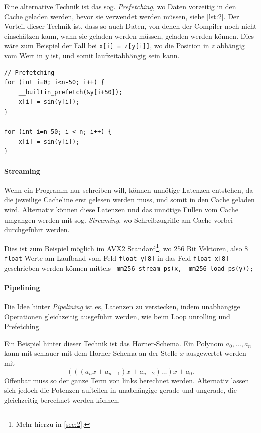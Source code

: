 Eine alternative Technik ist das sog. \emph{Prefetching}, wo Daten vorzeitig in den Cache geladen werden, bevor sie verwendet werden müssen, siehe \autoref{lst:2}.
Der Vorteil dieser Technik ist, dass so auch Daten, von denen der Compiler noch nicht einschätzen kann, wann sie geladen werden müssen, geladen werden können.
Dies wäre zum Beispiel der Fall bei \lstinline|x[i] = z[y[i]]|, wo die Position in \(z\) abhängig vom Wert in \(y\) ist, und somit laufzeitabhängig sein kann.

\begin{lstlisting}[label={lst:2}, caption={Prefetching für \autoref{lst:1}.}]
// Prefetching
for (int i=0; i<n-50; i++) {
    __builtin_prefetch(&y[i+50]);
    x[i] = sin(y[i]);
}

for (int i=n-50; i < n; i++) {
    x[i] = sin(y[i]);
}
\end{lstlisting}

\paragraph{Streaming}
Wenn ein Programm nur schreiben will, können unnötige Latenzen entstehen, da die jeweilige Cacheline erst gelesen werden muss, und somit in den Cache geladen wird.
Alternativ können diese Latenzen und das unnötige Füllen vom Cache umgangen werden mit sog. \emph{Streaming}, wo Schreibzugriffe am Cache vorbei durchgeführt werden.

Dies ist zum Beispiel möglich im AVX2 Standard\footnote{Mehr hierzu in \autoref{sec:2}.}, wo 256 Bit Vektoren, also 8 \lstinline|float| Werte am Laufband vom Feld \lstinline|float y[8]| in das Feld \lstinline|float x[8]| geschrieben werden können mittels \lstinline|_mm256_stream_ps(x, _mm256_load_ps(y));|

\paragraph{Pipelining}
Die Idee hinter \emph{Pipelining} ist es, Latenzen zu verstecken, indem unabhängige Operationen gleichzeitig ausgeführt werden, wie beim Loop unrolling und Prefetching.

Ein Beispiel hinter dieser Technik ist das Horner-Schema.
Ein Polynom \(a_0, \dots, a_n\) kann mit schlauer mit dem Horner-Schema an der Stelle \(x\) ausgewertet werden mit
\[(((a_n x + a_{n-1}) x + a_{n-2}) \dots ) x + a_0.\]
Offenbar muss so der ganze Term von links berechnet werden.
Alternativ lassen sich jedoch die Potenzen aufteilen in unabhängige gerade und ungerade, die gleichzeitig berechnet werden können.

